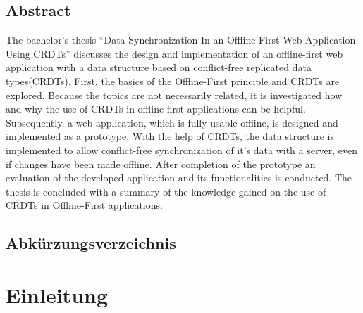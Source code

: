 \documentclass[a4paper, 12pt]{scrreprt}
\begin{document}
\section*{Abstract}
The bachelor's thesis \enquote{Data Synchronization In an Offline-First Web Application Using CRDTs} discusses the design and implementation of an offline-first web application with a data structure based on conflict-free replicated data types(CRDTs). First, the basics of the Offline-First principle and CRDTs are explored. Because the topics are not necessarily related, it is investigated how and why the use of CRDTs in offline-first applications can be helpful. Subsequently, a web application, which is fully usable offline, is designed and implemented as a prototype. With the help of CRDTs, the data structure is implemented to allow conflict-free synchronization of it's data with a server, even if changes have been made offline. After completion of the prototype an evaluation of the developed application and its functionalities is conducted. The thesis is concluded with a summary of the knowledge gained on the use of CRDTs in Offline-First applications.
\newpage

\pagestyle{fancy}
\cfoot{\thepage}
\lhead[\leftmark]{}
\rhead[]{\leftmark}

\tableofcontents
\newpage
\section*{Abkürzungsverzeichnis}
	\begin{acronym}[Bash]
	\end{acronym}

\newpage
{}
\chapter{Einleitung}\label{sec:Einleitung}
\end{document}
